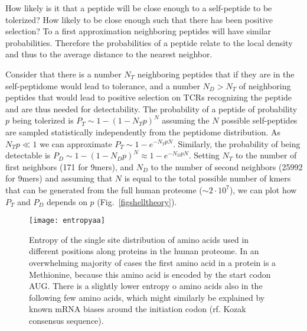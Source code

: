 \documentclass[superscriptaddress,twocolumn,pre]{revtex4}
\newcommand{\<}{\langle}
\renewcommand{\>}{\rangle}
\begin{document}
How likely is it that a peptide will be close enough to a self-peptide to be tolerized? How likely to be close enough such that there has been positive selection? To a first approximation neighboring peptides will have similar probabilities. Therefore the probabilities of a peptide relate to the local density and thus to the average distance to the nearest neighbor.

Consider that there is a number $N_T$ neighboring peptides that if they are in the self-peptidome would lead to tolerance, and a number $N_D > N_T$ of neighboring peptides that would lead to positive selection on TCRs recognizing the peptide and are thus needed for detectability. The probability of a peptide of probability $p$ being tolerized is $P_T \sim 1-(1-N_T p)^N$ assuming the $N$ possible self-peptides are sampled statistically independently from the peptidome distribution. As $N_T p \ll 1$ we can approximate $P_T \sim 1-e^{-N_T p N}$. Similarly, the probability of being detectable is $P_D \sim 1-(1-N_D p)^N \approx 1-e^{-N_D p N}$. Setting $N_T$ to the number of first neighbors (171 for 9mers), and $N_D$ to the number of second neighbors (25992 for 9mers) and assuming that $N$ is equal to the total possible number of kmers that can be generated from the full human proteome ($\sim 2 \cdot 10^7$), we can plot how $P_T$ and $P_D$ depends on $p$ (Fig.~\ref{figshelltheory}).




\begin{figure}
    \texttt{[image: entropyaa]}
    \caption{Entropy of the single site distribution of amino acids used in different positions along proteins in the human proteome. In an overwhelming majority of cases the first amino acid in a protein is a Methionine, because this amino acid is encoded by the start codon AUG. There is a slightly lower entropy o amino acids also in the following few amino acids, which might similarly be explained by known mRNA biases around the initiation codon (rf. Kozak consensus sequence). 
    \label{figentropyaa}
    }
\end{figure}



\end{document}
